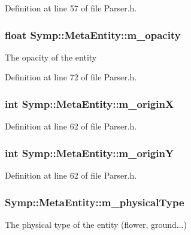 Definition at line 57 of file Parser.\-h.

\hypertarget{struct_symp_1_1_meta_entity_ae32c33284b8ffabecb2c5358294d2cb4}{
\subsubsection[{m\-\_\-opacity}]{\setlength{\rightskip}{0pt plus 5cm}float Symp\-::\-Meta\-Entity\-::m\-\_\-opacity}}\label{struct_symp_1_1_meta_entity_ae32c33284b8ffabecb2c5358294d2cb4}
The opacity of the entity 

Definition at line 72 of file Parser.\-h.

\hypertarget{struct_symp_1_1_meta_entity_a51906ceda9ebd508b87f275bf2506798}{
\subsubsection[{m\-\_\-origin\-X}]{\setlength{\rightskip}{0pt plus 5cm}int Symp\-::\-Meta\-Entity\-::m\-\_\-origin\-X}}\label{struct_symp_1_1_meta_entity_a51906ceda9ebd508b87f275bf2506798}


Definition at line 62 of file Parser.\-h.

\hypertarget{struct_symp_1_1_meta_entity_a352306cd387c39390a027809a4508a83}{
\subsubsection[{m\-\_\-origin\-Y}]{\setlength{\rightskip}{0pt plus 5cm}int Symp\-::\-Meta\-Entity\-::m\-\_\-origin\-Y}}\label{struct_symp_1_1_meta_entity_a352306cd387c39390a027809a4508a83}


Definition at line 62 of file Parser.\-h.

\hypertarget{struct_symp_1_1_meta_entity_adec983d933334ee27b5612ea6a67fa13}{
\subsubsection[{m\-\_\-physical\-Type}]{ Symp\-::\-Meta\-Entity\-::m\-\_\-physical\-Type}}\label{struct_symp_1_1_meta_entity_adec983d933334ee27b5612ea6a67fa13}
The physical type of the entity (flower, ground...) 

